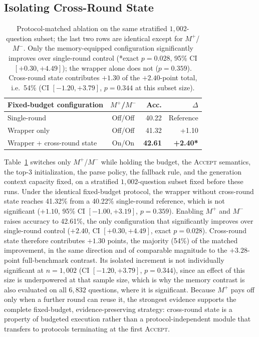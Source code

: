 \subsection{Isolating Cross-Round State}
\label{sec:ablations}

\begin{table}[t]
  \centering
  \small
  \begin{tabular}{lcrr}
    \toprule
    Fixed-budget configuration & $M^+$/$M^-$ & Acc. & $\Delta$ \\
    \midrule
    Single-round & Off/Off & 40.22 & Reference \\
    Wrapper only & Off/Off & 41.32 & \phantom{*}+1.10 \\
    Wrapper + cross-round state & On/On & \textbf{42.61} & \textbf{+2.40*} \\
    \bottomrule
  \end{tabular}
  \caption{Protocol-matched ablation on the same stratified $1{,}002$-question
  subset; the last two rows are identical except for $M^+$/$M^-$. Only the
  memory-equipped configuration significantly improves over single-round control
  (*exact $p=0.028$, 95\% CI $[+0.30,+4.49]$); the wrapper alone does not
  ($p=0.359$). Cross-round state contributes $+1.30$ of the $+2.40$-point total,
  i.e.\ 54\% (CI $[-1.20,+3.79]$, $p=0.344$ at this subset size).}
  \label{tab:ablations}
\end{table}

Table~\ref{tab:ablations} switches only $M^+$/$M^-$ while holding the budget,
the \textsc{Accept} semantics, the top-3 initialization, the parse policy, the
fallback rule, and the generation context capacity fixed, on a stratified
$1{,}002$-question subset fixed before these runs. Under the identical
fixed-budget protocol, the wrapper without cross-round state reaches 41.32\%
from a 40.22\% single-round reference, which is not significant ($+1.10$, 95\%
CI $[-1.00,+3.19]$, $p=0.359$). Enabling $M^+$ and $M^-$ raises accuracy to
42.61\%, the only configuration that significantly improves over single-round
control ($+2.40$, CI $[+0.30,+4.49]$, exact $p=0.028$). Cross-round state
therefore contributes $+1.30$ points, the majority (54\%) of the matched
improvement, in the same direction and of comparable magnitude to the
$+3.28$-point full-benchmark contrast. Its isolated increment is not
individually significant at $n=1{,}002$ (CI $[-1.20,+3.79]$, $p=0.344$), since
an effect of this size is underpowered at that sample size, which is why the
memory contrast is also evaluated on all $6{,}832$ questions, where it is
significant. Because $M^+$ pays off only when a further round can reuse it, the
strongest evidence supports the complete fixed-budget, evidence-preserving
strategy: cross-round state is a property of budgeted execution rather than a
protocol-independent module that transfers to protocols terminating at the first
\textsc{Accept}.

